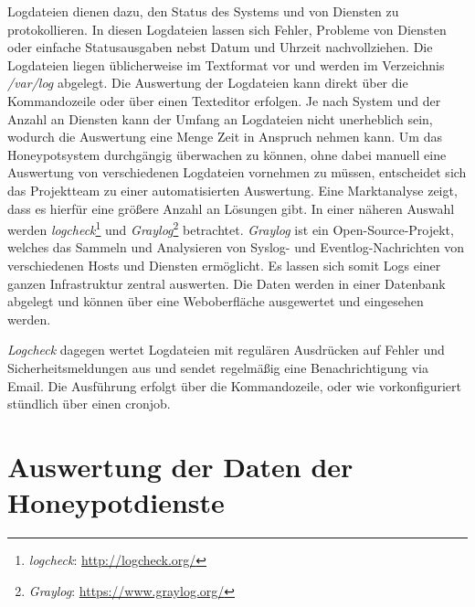 Logdateien dienen dazu, den Status des Systems und von Diensten zu protokollieren. In diesen Logdateien lassen sich Fehler, Probleme von Diensten oder einfache Statusausgaben nebst Datum und Uhrzeit nachvollziehen. Die Logdateien liegen üblicherweise im Textformat vor und werden im Verzeichnis \textit{/var/log} abgelegt. Die Auswertung der Logdateien kann direkt über die Kommandozeile oder über einen Texteditor erfolgen. Je nach System und der Anzahl an Diensten kann der Umfang an Logdateien nicht unerheblich sein, wodurch die Auswertung eine Menge Zeit in Anspruch nehmen kann. Um das Honeypotsystem durchgängig überwachen zu können, ohne dabei manuell eine Auswertung von verschiedenen Logdateien vornehmen zu müssen, entscheidet sich das Projektteam zu einer automatisierten Auswertung. Eine Marktanalyse zeigt, dass es hierfür eine größere Anzahl an Lösungen gibt. In einer näheren Auswahl werden \textit{logcheck}\footnote{ \textit{logcheck}: \url{http://logcheck.org/}} und \textit{Graylog}\footnote{ \textit{Graylog}: \url{https://www.graylog.org/}} betrachtet. \textit{Graylog} ist ein Open-Source-Projekt, welches das Sammeln und Analysieren von Syslog- und Eventlog-Nachrichten von verschiedenen Hosts und Diensten ermöglicht. Es lassen sich somit Logs einer ganzen Infrastruktur zentral auswerten. Die Daten werden in einer Datenbank abgelegt und können über eine Weboberfläche ausgewertet und eingesehen werden. 

\textit{Logcheck} dagegen wertet Logdateien mit regulären Ausdrücken auf Fehler und Sicherheitsmeldungen aus und sendet regelmäßig eine Benachrichtigung via Email. Die Ausführung erfolgt über die Kommandozeile, oder wie vorkonfiguriert stündlich über einen cronjob. 



\section{Auswertung der Daten der Honeypotdienste}
\label{sec:Auswertung der Daten der Honeypotdienste}


